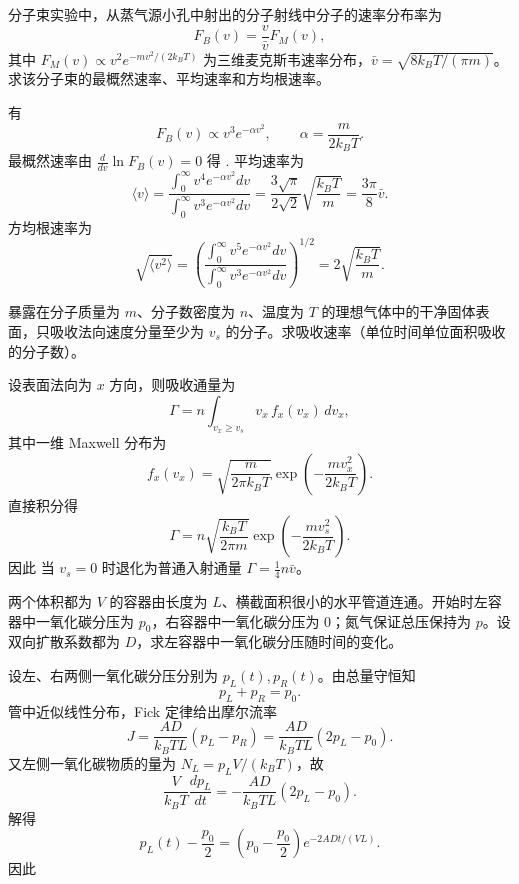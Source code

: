 \begin{question}
分子束实验中，从蒸气源小孔中射出的分子射线中分子的速率分布率为
\[
F_B(v)=\frac{v}{\bar v}F_M(v),
\]
其中 $F_M(v)\propto v^2 e^{-mv^2/(2k_BT)}$ 为三维麦克斯韦速率分布，$\bar v=\sqrt{8k_BT/(\pi m)}$。求该分子束的最概然速率、平均速率和方均根速率。
\begin{solution}
有
\[
F_B(v)\propto v^3e^{-\alpha v^2},\qquad \alpha=\frac{m}{2k_BT}.
\]
最概然速率由 $\frac{d}{dv}\ln F_B(v)=0$ 得
.
平均速率为
\[
\langle v\rangle=\frac{\int_0^{\infty}v^4e^{-\alpha v^2}dv}{\int_0^{\infty}v^3e^{-\alpha v^2}dv}
=\frac{3\sqrt\pi}{2\sqrt2}\sqrt{\frac{k_BT}{m}}
=\frac{3\pi}{8}\bar v.
\]
方均根速率为
\[
\sqrt{\langle v^2\rangle}=\left(\frac{\int_0^{\infty}v^5e^{-\alpha v^2}dv}{\int_0^{\infty}v^3e^{-\alpha v^2}dv}\right)^{1/2}
=2\sqrt{\frac{k_BT}{m}}.
\]
\end{solution}
\end{question}

\begin{question}
暴露在分子质量为 $m$、分子数密度为 $n$、温度为 $T$ 的理想气体中的干净固体表面，只吸收法向速度分量至少为 $v_s$ 的分子。求吸收速率（单位时间单位面积吸收的分子数）。
\begin{solution}
设表面法向为 $x$ 方向，则吸收通量为
\[
\Gamma=n\int_{v_x\ge v_s}v_x\,f_x(v_x)\,dv_x,
\]
其中一维 Maxwell 分布为
\[
f_x(v_x)=\sqrt{\frac{m}{2\pi k_BT}}\exp\!\left(-\frac{mv_x^2}{2k_BT}\right).
\]
直接积分得
\[
\Gamma=n\sqrt{\frac{k_BT}{2\pi m}}\exp\!\left(-\frac{mv_s^2}{2k_BT}\right).
\]
因此
当 $v_s=0$ 时退化为普通入射通量 $\Gamma=\frac14n\bar v$。
\end{solution}
\end{question}

\begin{question}
两个体积都为 $V$ 的容器由长度为 $L$、横截面积很小的水平管道连通。开始时左容器中一氧化碳分压为 $p_0$，右容器中一氧化碳分压为 $0$；氮气保证总压保持为 $p$。设双向扩散系数都为 $D$，求左容器中一氧化碳分压随时间的变化。
\begin{solution}
设左、右两侧一氧化碳分压分别为 $p_L(t),p_R(t)$。由总量守恒知
\[
p_L+p_R=p_0.
\]
管中近似线性分布，Fick 定律给出摩尔流率
\[
J=\frac{AD}{k_BT L}(p_L-p_R)=\frac{AD}{k_BT L}(2p_L-p_0).
\]
又左侧一氧化碳物质的量为 $N_L=p_LV/(k_BT)$，故
\[
\frac{V}{k_BT}\frac{dp_L}{dt}=-\frac{AD}{k_BT L}(2p_L-p_0).
\]
解得
\[
p_L(t)-\frac{p_0}{2}=\left(p_0-\frac{p_0}{2}\right)e^{-2ADt/(VL)}.
\]
因此
\end{solution}
\end{question}


